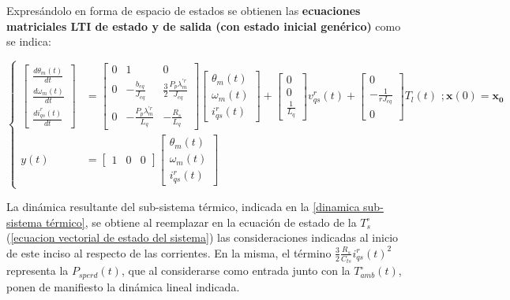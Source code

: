 \documentclass[a4paper, 10pt, onecolumn,journal]{ieeeconf}
\begin{document}
Expresándolo en forma de espacio de estados se obtienen las
\textbf{ecuaciones matriciales LTI de estado y de salida (con estado inicial genérico)}
como se indica:

\begin{equation}
	\begin{cases}
		\begin{bmatrix}
			\frac{d \theta_m(t)}{dt} \\ 
			\frac{d \omega_m(t)}{dt}\\
			\frac{d i^r_{qs}(t)}{dt}  
		\end{bmatrix}
		 &= 
		 \begin{bmatrix}
		 	0 & 1 & 0 \\ 
		 	0 & - \frac{b_{eq}}{J_{eq}} & \frac{3}{2} \frac{P_p \lambda^{'r}_m}{J_{eq}} \\
		 	0 &  - \frac{P_p  \lambda^{'r}_m}{L_q} & -\frac{R_s}{L_q}
		 \end{bmatrix}
		 \begin{bmatrix}
		 	{\theta}_m(t) \\ 
		 	{\omega}_m(t)\\
		 	{i}^r_{qs}(t)  
		 \end{bmatrix}
		 +
		 \begin{bmatrix}
		 	0 \\ 
		 	0\\
		 	\frac{1}{L_q}  
		 \end{bmatrix}
		 v^r_{qs}(t)+
		 \begin{bmatrix}
		 	0 \\ 
		 	- \frac{1}{r J_{eq}}\\
		 	0 
		 \end{bmatrix} T_l(t)\,\,; \mathbf{x}(0) = \mathbf{x_0}\\
		 y(t) &= \begin{bmatrix}
		 		1 & 0 & 0
		 	 \end{bmatrix}
		 	 \begin{bmatrix}
		 	 	{\theta}_m(t) \\ 
		 	 	{\omega}_m(t)\\
		 	 	{i}^r_{qs}(t)
		 	 \end{bmatrix}
	\end{cases}
	\label{ecuacion matricial con ids=0}
\end{equation}

La dinámica resultante del sub-sistema térmico,
indicada en la \cref{dinamica sub-sistema térmico},
se obtiene al reemplazar en la ecuación de estado de la $T^{\circ}_s$
(\cref{ecuacion vectorial de estado del sistema}) las consideraciones indicadas al inicio de este inciso al
respecto de las corrientes. En la misma, el término $\frac{3}{2}\frac{R_{s}}{C_{ts}} {i^r_{qs}(t)}^2$ representa
la $P_{sperd}(t)$, que al considerarse como entrada junto con la $T^{\circ}_{amb}(t)$, ponen de
manifiesto la dinámica lineal indicada.
\end{document}
